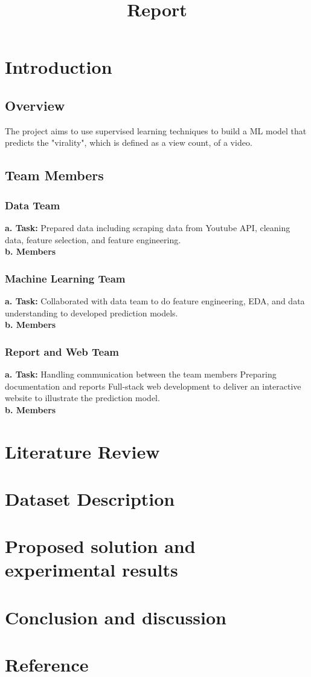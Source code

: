 \documentclass{article}
\title{Report}
\begin{document}
\maketitle

\section{Introduction}
\subsection{Overview}
The project aims to use supervised learning techniques to build a ML model that predicts the "virality", which is defined as a view count, of a video. 
\subsection{Team Members}
\subsubsection{Data Team}
\textbf{a. Task: }
Prepared data including scraping data from Youtube API, cleaning data, feature selection, and feature engineering.\\
\textbf{b. Members}
\subsubsection{Machine Learning Team}
\textbf{a. Task: }
Collaborated with data team to do feature engineering, EDA, and data understanding to developed prediction models.\\
\textbf{b. Members}
\subsubsection{Report and Web Team}
\textbf{a. Task: }
Handling communication between the team members
Preparing documentation and reports
Full-stack web development to deliver an interactive website to illustrate the prediction model.\\
\textbf{b. Members}





\section{Literature Review}
\section{Dataset Description}
\section{Proposed solution and experimental results}
\section{Conclusion and discussion}
\section{Reference}
\end{document}
